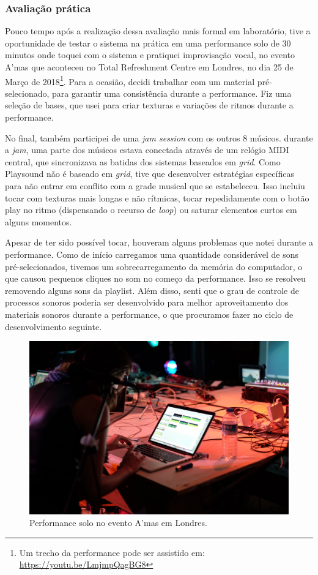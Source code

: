 \begin{description}
\subsubsection{Avaliação prática}

Pouco tempo após a realização dessa avaliação mais formal em laboratório, tive a oportunidade de testar o sistema na prática em uma performance solo de 30 minutos onde toquei com o sistema e pratiquei improvisação vocal, no evento A'mas que aconteceu no Total Refreshment Centre em Londres, no dia 25 de Março de 2018\footnote{Um trecho da performance pode ser assistido em: \url{https://youtu.be/LmjmpQagBG8}}. Para a ocasião, decidi trabalhar com um material pré-selecionado, para garantir uma consistência durante a performance. Fiz uma seleção de bases, que usei para criar texturas e variações de ritmos durante a performance. 

No final, também participei de uma \emph{jam session} com os outros 8 músicos. durante a \emph{jam}, uma parte dos músicos estava conectada através de um relógio MIDI central, que sincronizava as batidas dos sistemas baseados em \emph{grid}. Como Playsound não é baseado em \emph{grid}, tive que desenvolver estratégias específicas para não entrar em conflito com a grade musical que se estabeleceu. Isso incluiu tocar com texturas mais longas e não rítmicas, tocar repedidamente com o botão play no ritmo (dispensando o recurso de \emph{loop}) ou saturar elementos curtos em alguns momentos.

Apesar de ter sido possível tocar, houveram alguns problemas que notei durante a performance. Como de início carregamos uma quantidade considerável de sons pré-selecionados, tivemos um sobrecarregamento da memória do computador, o que causou pequenos cliques no som no começo da performance. Isso se resolveu removendo alguns sons da playlist. Além disso, senti que o grau de controle de processos sonoros poderia ser desenvolvido para melhor aproveitamento dos materiais sonoros durante a performance, o que procuramos fazer no ciclo de desenvolvimento seguinte.

\begin{figure}

\includegraphics[width=1\textwidth]{pictures/cap4/ariane_amas}
\caption{\label{amas}Performance solo no evento A'mas em Londres.}
\label{fig:amas}
\end{figure}



\end{description}
